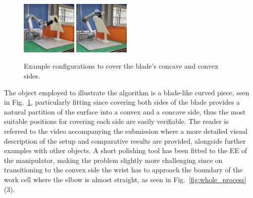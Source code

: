 \documentclass[letterpaper,journal]{IEEEtran}
\begin{document}
\begin{figure}[t]
\centering
\includegraphics[width = 0.24\textwidth]{figures/real_world/concave_blade_2}
\includegraphics[width = 0.24\textwidth]{figures/real_world/convex_blade_2}
\caption{Example configurations to cover the blade's concave and convex sides. }
\label{fig:real_world}
\vspace{-0.5cm}
\end{figure}


The object employed to illustrate the algorithm is a blade-like curved piece, seen in Fig.~\ref{fig:real_world}, particularly fitting since covering both sides of the blade provides a natural partition of the surface into a convex and a concave side, thus the most suitable positions for covering each side are easily verifiable. 
The reader is referred to the video accompanying the submission where a more detailed visual description of the setup and comparative results are provided, alongside further examples with other objects. 
A short polishing tool has been fitted to the EE of the manipulator, making the problem slightly more challenging since on transitioning to the convex side the wrist has to approach the boundary of the work cell where the elbow is almost straight, as seen in Fig.~\ref{fig:whole_process} (3).
\end{document}
